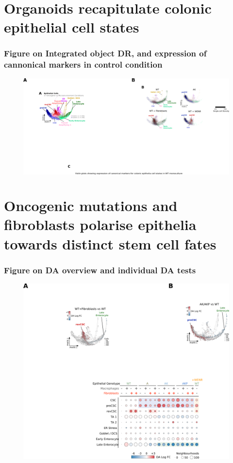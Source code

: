 \section{Organoids recapitulate colonic epithelial cell states}

\subsubsection{Figure on Integrated object DR, and expression of cannonical markers in control condition}
\begin{figure}
    \centering
    \includegraphics{04seq/figs/4SEQ_INTctrl.png}
    \caption{}
    \label{fig:}
\end{figure}

\section{Oncogenic mutations and fibroblasts polarise epithelia towards distinct stem cell fates}

\subsubsection{Figure on DA overview and individual DA tests}

\begin{figure}
    \centering
    \includegraphics{04seq/figs/4SEQ_DA.png}
    \caption{}
    \label{fig:}
\end{figure}

